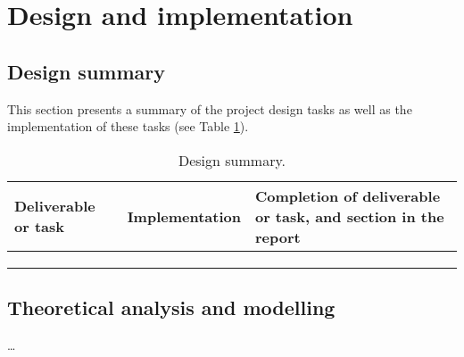 
\section{Design and implementation}


\subsection{Design summary}

This section presents a summary of the project design tasks as well as the implementation of these tasks (see Table \ref{tab:design_summary}).

\begin{table}[ht]
	\renewcommand{\arraystretch}{1.3}
	\centering
	\begin{tabular}{|>{\raggedright}m{5cm}|>{\raggedright}m{5cm}|>{\raggedright\arraybackslash}m{5cm}|}
		\hline
		\textbf{Deliverable or task} & \textbf{Implementation} & \textbf{Completion of deliverable or task, and section in the report} \\
		\hline
		 & & \\
		\hline
		 & & \\
		\hline
		 & & \\
		\hline
	\end{tabular}
	\caption{\label{tab:design_summary}Design summary.}
\end{table}

\subsection{Theoretical analysis and modelling}


\ldots

\newpage


